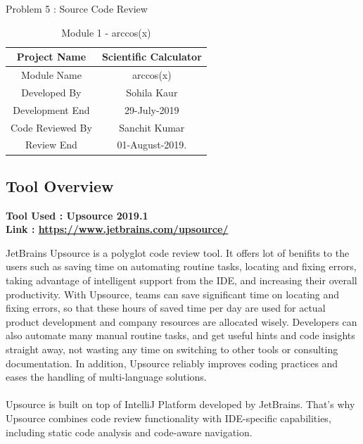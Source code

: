 \documentclass[a4paper,12pt]{article}
\begin{document}
\begin{section}{Problem 5 : Source Code Review}
\renewcommand{\arraystretch}{1.5}
\begin{table}[htp]
	\centering
	\caption{Module 1 - arccos(x)} \vspace{0.5cm} \label{tab:definition_table} 
	\begin{tabular}{||c|c||}
		\hline \hline 
		\LARGE Project Name & \LARGE Scientific Calculator  \\ 
		\hline
		\LARGE Module Name & \LARGE arccos(x)  \\
		\hline
		\LARGE Developed By & \LARGE Sohila Kaur \\
		\hline
		\LARGE Development End & \LARGE 29-July-2019 \\
		\hline  
		\LARGE Code Reviewed By & \LARGE Sanchit Kumar \\
		\hline 
		\LARGE Review End & \LARGE 01-August-2019. \\
		\hline \hline
	\end{tabular}
\end{table}


\vspace{1cm}

\subsection{Tool Overview}

\vspace{3mm}

\large \textbf{Tool Used : Upsource 2019.1} \\  \vspace{0.5cm} 
\large \textbf{Link : \url{https://www.jetbrains.com/upsource/}}

\vspace{3mm}

JetBrains Upsource is a polyglot code review tool. It offers lot of benifits to the users such as saving time on automating routine tasks, locating and fixing errors, taking advantage of intelligent support from the IDE, and increasing their overall productivity. With Upsource, teams can save significant time on locating and fixing errors, so that these hours of saved time per day are used for actual product development and company resources are allocated wisely. Developers can also automate many manual routine tasks, and get useful hints and code insights straight away, not wasting any time on switching to other tools or consulting documentation. In addition, Upsource reliably improves coding practices and eases the handling of multi-language solutions. \\ \\ 
Upsource is built on top of IntelliJ Platform developed by JetBrains. That’s why Upsource combines code review functionality with IDE-specific capabilities, including static code analysis and code-aware navigation.
\\


\end{section}
\end{document}

